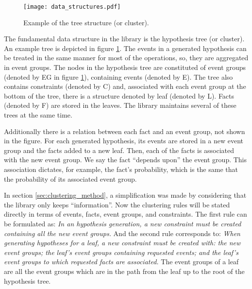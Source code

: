 \ifx \ommitimages  \undefined
\begin{figure}[thpb]
    \centering
    \texttt{[image: data\_structures.pdf]}
    \caption{Example of the tree structure (or cluster).}
    \label{fig:tree_structure}
\end{figure}
\fi


The fundamental data structure in the library is the hypothesis tree (or cluster). An example tree is depicted in figure \ref{fig:tree_structure}. 
The events in a generated hypothesis can be treated in the same manner for most of the operations, so, they are aggregated in event groups.
The nodes in the hypothesis tree are constituted of event groups (denoted by EG in figure \ref{fig:tree_structure}), containing events (denoted by E). The tree also contains constraints (denoted by C) and, associated with each event group at the bottom of the tree, there is a structure denoted by leaf (denoted by L). Facts (denoted by F) are stored in the leaves.
The library maintains several of these trees at the same time.

Additionally there is a relation between each fact and an event group, not shown in the figure. For each generated hypothesis, its events are stored in a new event group and the facts added to a new leaf. Then, each of the facts is associated with the new event group. We say the fact ``depends upon'' the event group. This association dictates, for example, the fact's probability, which is the same that the probability of its associated event group.

In section \ref{sec:clustering_method}, a simplification was made by considering that the library only keeps ``information''. Now the clustering rules will be stated directly in terms of events, facts, event groups, and constraints. The first rule can be formulated as: \textit{In an hypothesis generation, a new constraint must be created containing all the new event groups.} And the second rule corresponds to: \textit{When generating hypotheses for a leaf, a new constraint must be created with: the new event groups; the leaf's event groups containing requested events; and the leaf's event groups to which requested facts are associated.} The event groups of a leaf are all the event groups which are in the path from the leaf up to the root of the hypothesis tree.


